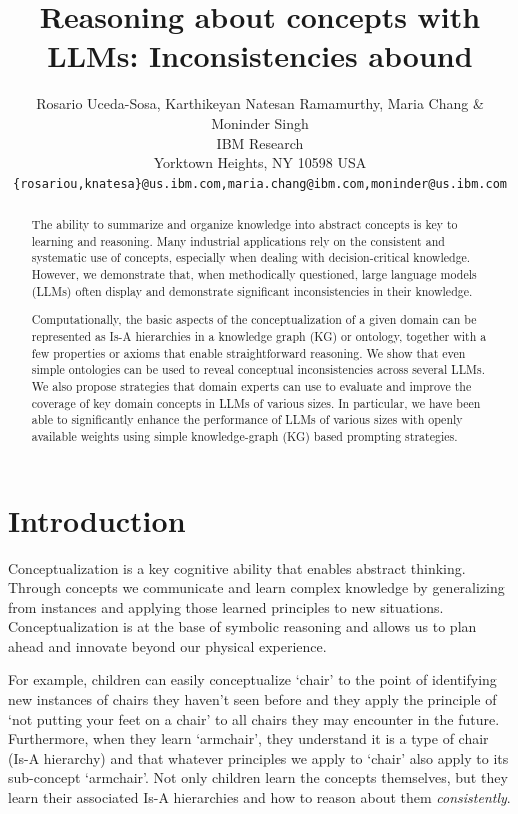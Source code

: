 \documentclass{article} %
\title{Reasoning about concepts with LLMs: Inconsistencies abound}
\author{Rosario Uceda-Sosa, Karthikeyan Natesan Ramamurthy, Maria Chang \& Moninder Singh \\
IBM Research\\
Yorktown Heights, NY 10598 USA \\
\texttt{\{rosariou,knatesa\}@us.ibm.com,maria.chang@ibm.com,moninder@us.ibm.com}
}
\date{}
\begin{document}
\maketitle

\begin{abstract}
The ability to summarize and organize knowledge into abstract concepts is key to learning and reasoning. Many industrial applications rely on the consistent and systematic use of concepts, especially when dealing with decision-critical knowledge. However, we demonstrate that, when methodically questioned, large language models (LLMs) often display and demonstrate significant inconsistencies in their knowledge.

Computationally, the basic aspects of the conceptualization of a given domain can be represented as Is-A hierarchies in a knowledge graph (KG) or ontology, together with a few properties or axioms that enable straightforward reasoning. We show that even simple ontologies can be used to reveal conceptual inconsistencies across several LLMs. We also propose strategies that domain experts can use to evaluate and improve the coverage of key domain concepts in LLMs of various sizes. In particular, we have been able to significantly enhance the performance of LLMs of various sizes with openly available weights using simple knowledge-graph (KG) based prompting strategies.  
\end{abstract}

\section{Introduction} \label{sec:introduction}

Conceptualization is a key cognitive ability that enables abstract thinking. Through concepts we communicate and learn complex knowledge by generalizing from instances and applying those learned principles to new situations. Conceptualization is at the base of symbolic reasoning and allows us to plan ahead and innovate beyond our physical experience.   

For example, children can easily conceptualize `chair' to the point of identifying new instances of chairs they haven't seen before and they apply the principle of `not putting your feet on a chair' to all chairs they may encounter in the future. Furthermore, when they learn `armchair', they understand it is a type of chair (Is-A hierarchy) and that whatever principles we apply to `chair' also apply to its sub-concept `armchair'. Not only children learn the concepts themselves, but they learn their associated Is-A hierarchies and how to reason about them {\em consistently}. 
\end{document}
